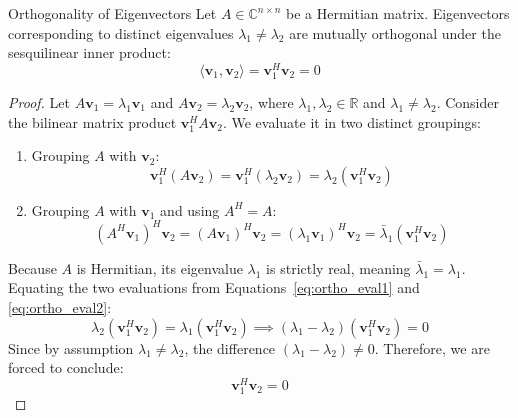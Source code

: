 \begin{theorembox}{Orthogonality of Eigenvectors}
\label{thm:ortho_eigenvectors}
Let $A \in \mathbb{C}^{n \times n}$ be a Hermitian matrix. Eigenvectors corresponding to distinct eigenvalues $\lambda_1 \ne \lambda_2$ are mutually orthogonal under the sesquilinear inner product:
\begin{equation}
\langle \mathbf{v}_1, \mathbf{v}_2 \rangle = \mathbf{v}_1^H \mathbf{v}_2 = 0
\end{equation}
\end{theorembox}

\begin{proof}
Let $A\mathbf{v}_1 = \lambda_1 \mathbf{v}_1$ and $A\mathbf{v}_2 = \lambda_2 \mathbf{v}_2$, where $\lambda_1, \lambda_2 \in \mathbb{R}$ and $\lambda_1 \ne \lambda_2$.
Consider the bilinear matrix product $\mathbf{v}_1^H A \mathbf{v}_2$. We evaluate it in two distinct groupings:
\begin{enumerate}
    \item Grouping $A$ with $\mathbf{v}_2$:
    \begin{equation}
    \mathbf{v}_1^H (A \mathbf{v}_2) = \mathbf{v}_1^H (\lambda_2 \mathbf{v}_2) = \lambda_2 (\mathbf{v}_1^H \mathbf{v}_2)
    \label{eq:ortho_eval1}
    \end{equation}
    \item Grouping $A$ with $\mathbf{v}_1$ and using $A^H = A$:
    \begin{equation}
    (A^H \mathbf{v}_1)^H \mathbf{v}_2 = (A \mathbf{v}_1)^H \mathbf{v}_2 = (\lambda_1 \mathbf{v}_1)^H \mathbf{v}_2 = \bar{\lambda}_1 (\mathbf{v}_1^H \mathbf{v}_2)
    \label{eq:ortho_eval2}
    \end{equation}
\end{enumerate}
Because $A$ is Hermitian, its eigenvalue $\lambda_1$ is strictly real, meaning $\bar{\lambda}_1 = \lambda_1$. Equating the two evaluations from Equations~\eqref{eq:ortho_eval1} and \eqref{eq:ortho_eval2}:
\begin{equation}
\lambda_2 (\mathbf{v}_1^H \mathbf{v}_2) = \lambda_1 (\mathbf{v}_1^H \mathbf{v}_2) \implies (\lambda_1 - \lambda_2)(\mathbf{v}_1^H \mathbf{v}_2) = 0
\end{equation}
Since by assumption $\lambda_1 \ne \lambda_2$, the difference $(\lambda_1 - \lambda_2) \ne 0$. Therefore, we are forced to conclude:
\begin{equation}
\mathbf{v}_1^H \mathbf{v}_2 = 0
\end{equation}
\end{proof}

